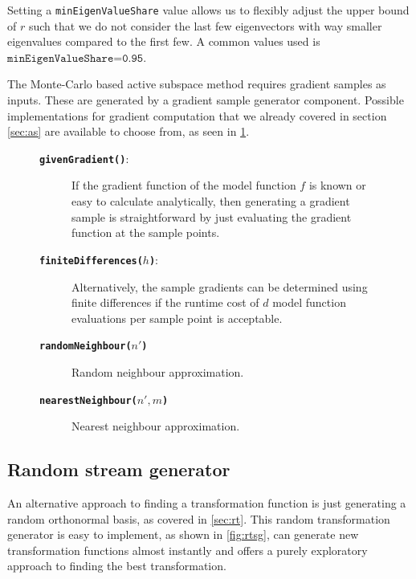 \documentclass[
  a4paper,  %
  twoside,  %
  bibliography=totoc,
  headsepline,
  cleardoublepage=empty,
  parskip=half,
  draft=false
]{scrbook}
\begin{document}
Setting a \texttt{minEigenValueShare} value allows us to flexibly adjust the upper bound of $r$ such that we do not consider the last few eigenvectors with way smaller eigenvalues compared to the first few.
A common values used is $\texttt{minEigenValueShare=0.95}$.

The Monte-Carlo based active subspace method requires gradient samples as inputs.
These are generated by a gradient sample generator component.
Possible implementations for gradient computation that we already covered in section \cref{sec:as} are available to choose from, as seen in \cref{fig:gg}.


\newpage

\begin{mdframed}[style=style,frametitle={Gradient sample generator}]
\begin{figure}[H]
\begin{description}
\item[\texttt{\textbf{givenGradient()}}:] If the gradient function of the model function $f$ is known or easy to calculate analytically, then generating a gradient sample is straightforward by just evaluating the gradient function at the sample points.
\item[\texttt{\textbf{finiteDifferences($h$)}}:] Alternatively, the sample gradients can be determined using finite differences if the runtime cost of $d$ model function evaluations per sample point is acceptable.
\item[\texttt{\textbf{randomNeighbour($n'$)}}] Random neighbour approximation.
\item[\texttt{\textbf{nearestNeighbour($n', m$)}}] Nearest neighbour approximation.
\end{description}
\delimit
{}
\label{fig:gg}
\end{figure}
\end{mdframed}

\subsection {Random stream generator}
\label{sec:rtg}

An alternative approach to finding a transformation function is just generating a random orthonormal basis, as covered in \cref{sec:rt}.
This random transformation generator is easy to implement, as shown in \cref{fig:rtsg}, can generate new transformation functions almost instantly and offers a purely exploratory approach to finding the best transformation.
\end{document}
